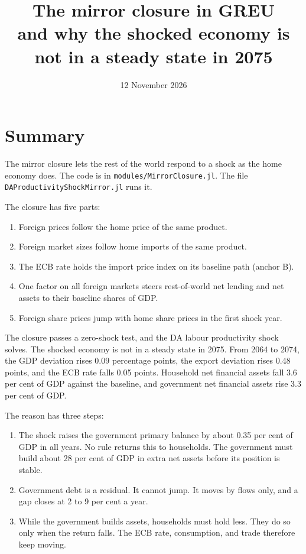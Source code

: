 \documentclass[11pt,a4paper]{article}
\title{The mirror closure in GREU\\ and why the shocked economy is not in a steady state in 2075}
\author{}
\date{12 November 2026}
\newcommand{\code}[1]{\texttt{#1}}
\begin{document}
\maketitle

\section{Summary}

The mirror closure lets the rest of the world respond to a shock as the home economy does.
The code is in \code{modules/MirrorClosure.jl}. The file \code{DAProductivityShockMirror.jl} runs it.

The closure has five parts:
\begin{enumerate}
\item Foreign prices follow the home price of the same product.
\item Foreign market sizes follow home imports of the same product.
\item The ECB rate holds the import price index on its baseline path (anchor B).
\item One factor on all foreign markets steers rest-of-world net lending and net assets to their baseline shares of GDP.
\item Foreign share prices jump with home share prices in the first shock year.
\end{enumerate}

The closure passes a zero-shock test, and the DA labour productivity shock solves.
The shocked economy is not in a steady state in 2075.
From 2064 to 2074, the GDP deviation rises 0.09 percentage points, the export deviation rises 0.48 points, and the ECB rate falls 0.05 points.
Household net financial assets fall 3.6 per cent of GDP against the baseline, and government net financial assets rise 3.3 per cent of GDP.

The reason has three steps:
\begin{enumerate}
\item The shock raises the government primary balance by about 0.35 per cent of GDP in all years. No rule returns this to households. The government must build about 28 per cent of GDP in extra net assets before its position is stable.
\item Government debt is a residual. It cannot jump. It moves by flows only, and a gap closes at 2 to 9 per cent a year.
\item While the government builds assets, households must hold less. They do so only when the return falls. The ECB rate, consumption, and trade therefore keep moving.
\end{enumerate}
\end{document}
